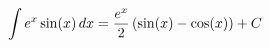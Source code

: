 \documentclass[preview]{standalone}
\begin{document}
\begin{align*}
\special{dvisvgm:raw <g id='unique000'>}\int e^x \sin(x) \, dx = \frac{e^x}{2} \left( \sin(x) - \cos(x) \right) + C\special{dvisvgm:raw </g>}
\end{align*}
\end{document}
